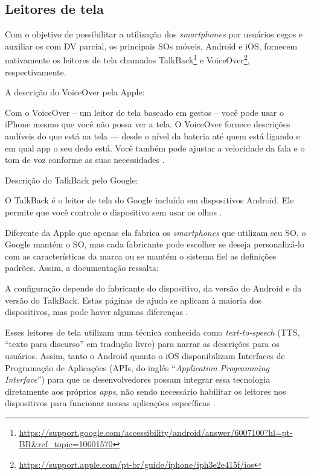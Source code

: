 \subsection{Leitores de tela}

Com o objetivo de possibilitar a utilização dos \emph{smartphones} por usuários cegos e auxiliar os com DV parcial, os principais SOs móveis, Android e iOS,
fornecem nativamente os leitores de tela chamados TalkBack\footnote{\url{https://support.google.com/accessibility/android/answer/6007100?hl=pt-BR&ref_topic=10601570}}
e VoiceOver\footnote{\url{https://support.apple.com/pt-br/guide/iphone/iph3e2e415f/ios}}, respectivamente.

A descrição do VoiceOver pela Apple:

\begin{citacao}
    Com o VoiceOver – um leitor de tela baseado em gestos – você pode usar o iPhone mesmo que você não possa ver a tela.
    O VoiceOver fornece descrições audíveis do que está na tela — desde o nível da bateria até quem está ligando e em qual
    app o seu dedo está. Você também pode ajustar a velocidade da fala e o tom de voz conforme as suas necessidades \cite{VoiceOver2021}.
\end{citacao}

Descrição do TalkBack pelo Google:

\begin{citacao}
    O TalkBack é o leitor de tela do Google incluído em dispositivos Android.
    Ele permite que você controle o dispositivo sem usar os olhos \cite{TalkBak2021}.
\end{citacao}

Diferente da Apple que apenas ela fabrica os \emph{smartphones} que utilizam seu SO, o Google mantém o SO, mas cada fabricante
pode escolher se deseja personalizá-lo com as características da marca ou se mantém o sistema fiel as definições padrões. Assim, a documentação ressalta:

\begin{citacao}
    A configuração depende do fabricante do dispositivo, da versão do Android e da versão do TalkBack.
    Estas páginas de ajuda se aplicam à maioria dos dispositivos, mas pode haver algumas diferenças \cite{TalkBak2021}.
\end{citacao}

Esses leitores de tela utilizam uma técnica conhecida como \emph{text-to-speech} (TTS, ``texto para discurso'' em tradução livre) para narrar as descrições para
os usuários. Assim, tanto o Android quanto o iOS disponibilizam Interfaces de Programação de Aplicações
(APIs, do inglês ``\emph{Application Programming Interface}'') para que os desenvolvedores possam integrar essa tecnologia diretamente aos
próprios \emph{apps}, não sendo necessário habilitar os leitores nos dispositivos para funcionar nessas aplicações específicas
\cite{Heesook2017,Biase2018,Oliveira2019,Caballero2020}.

